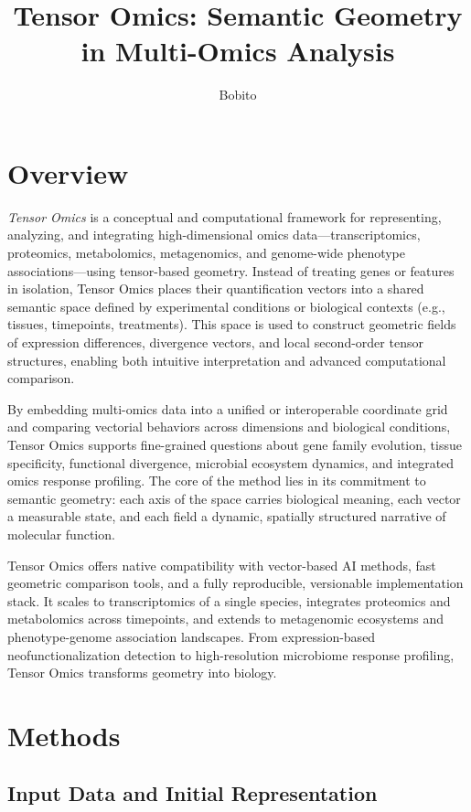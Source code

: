 \documentclass[11pt]{article}
\title{\textbf{Tensor Omics: Semantic Geometry in Multi-Omics Analysis}}
\author{Bobito}
\date{}
\begin{document}
\maketitle

\section{Overview}

\textit{Tensor Omics} is a conceptual and computational framework for representing, analyzing, and integrating high-dimensional omics data—transcriptomics, proteomics, metabolomics, metagenomics, and genome-wide phenotype associations—using tensor-based geometry. Instead of treating genes or features in isolation, Tensor Omics places their quantification vectors into a shared semantic space defined by experimental conditions or biological contexts (e.g., tissues, timepoints, treatments). This space is used to construct geometric fields of expression differences, divergence vectors, and local second-order tensor structures, enabling both intuitive interpretation and advanced computational comparison.

By embedding multi-omics data into a unified or interoperable coordinate grid and comparing vectorial behaviors across dimensions and biological conditions, Tensor Omics supports fine-grained questions about gene family evolution, tissue specificity, functional divergence, microbial ecosystem dynamics, and integrated omics response profiling. The core of the method lies in its commitment to semantic geometry: each axis of the space carries biological meaning, each vector a measurable state, and each field a dynamic, spatially structured narrative of molecular function.

Tensor Omics offers native compatibility with vector-based AI methods, fast geometric comparison tools, and a fully reproducible, versionable implementation stack. It scales to transcriptomics of a single species, integrates proteomics and metabolomics across timepoints, and extends to metagenomic ecosystems and phenotype-genome association landscapes. From expression-based neofunctionalization detection to high-resolution microbiome response profiling, Tensor Omics transforms geometry into biology.

\section{Methods}

\subsection{Input Data and Initial Representation}
\end{document}
